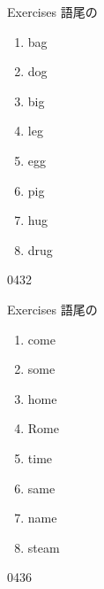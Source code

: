 \documentclass[aspectratio=169,xcolor={dvipsnames,table}]{beamer}
\begin{document}
\begin{frame}[plain]{Exercises 語尾の}
  \Large
  \begin{enumerate}
    \item bag
    \item dog
    \item big
    \item leg
    \item egg
    \item pig
    \item hug
    \item drug
  \end{enumerate}

  \hfill{\tiny 0432}\,{\scriptsize {}}\end{frame}
\begin{frame}[plain]{Exercises 語尾の}
  \Large
  \begin{enumerate}
    \item come
    \item some
    \item home
    \item Rome
    \item time
    \item same
    \item name
    \item steam
  \end{enumerate}

  \hfill{\tiny 0436}\,{\scriptsize {}}\end{frame}
\end{document}

